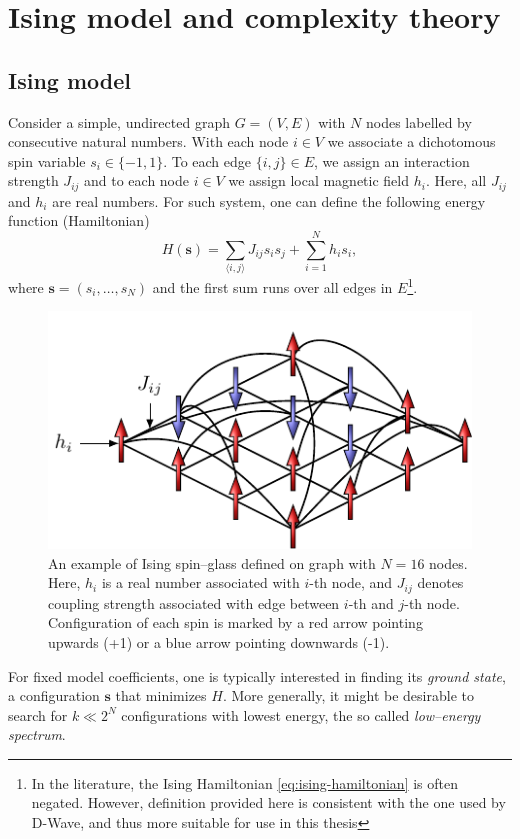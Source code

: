 \chapter{Ising model and complexity theory}

\section{Ising model}
Consider a simple, undirected graph $G = (V, E)$ with $N$ nodes labelled by consecutive natural numbers. With each node $i \in V$ we associate a dichotomous spin variable $s_i \in \{-1, 1\}$. To each edge $\{i, j\} \in E$, we assign an interaction strength $J_{ij}$ and to each node $i \in V$ we assign local magnetic field $h_i$. Here, all $J_{ij}$ and $h_i$ are real numbers. For such system, one can define the following energy function (Hamiltonian)
\begin{equation}
\label{eq:ising-hamiltonian}
H(\mathbf{s}) = \sum_{\langle i, j \rangle} J_{ij} s_i s_j +  \sum_{i=1}^N h_i s_i,
\end{equation}
where $\mathbf{s} = (s_i, \ldots, s_N)$ and the first sum runs over all edges in $E$\footnote{In the literature, the Ising Hamiltonian \eqref{eq:ising-hamiltonian} is often negated. However, definition provided here is consistent with the one used by D-Wave, and thus more suitable for use in this thesis}.
\begin{figure}
    \centering
    \includegraphics{figures/spins.pdf}
    \caption{An example of Ising  spin--glass defined on graph with $N=16$ nodes. Here, $h_i$ is a real number associated with $i$-th node, and $J_{ij}$ denotes coupling strength associated with edge between $i$-th and $j$-th node. Configuration of each spin is marked by a red arrow pointing upwards (+1) or a blue arrow pointing downwards (-1).}
    \label{fig:my_label}
\end{figure}
For fixed model coefficients, one is typically interested in finding its \emph{ground state}, a configuration $\mathbf{s}$ that minimizes $H$. More generally, it might be desirable to search for $k \ll 2^N$ configurations with lowest energy, the so called \emph{low--energy spectrum}.

